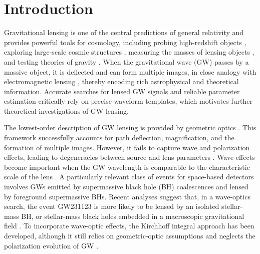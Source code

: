 \documentclass[reprint,amsmath,amssymb,aps,prd]{revtex4-2}
\begin{document}
\maketitle

\section{\label{introduction}Introduction}


Gravitational lensing is one of the central predictions of general relativity and provides powerful tools for cosmology, including probing high-redshift objects \cite{Dan_2012,Vieira_2013,Yang_2022}, exploring large-scale cosmic structures \cite{Refregier_2003,Cao_2012}, measuring the masses of lensing objects \cite{Bolton_2008,Hou_2019_b}, and testing theories of gravity \cite{Wang_2024,Liu_2022}. When the gravitational wave (GW) passes by a massive object, it is deflected and can form multiple images, in close analogy with electromagnetic lensing \cite{Piorkowska_2013,Lin_2023,Haris_2018,Hannuksela_2019,McIsaac_2020,XiaoshuLiu_2021,LIGO_2021,Lo_2023,Abbott_2024,Lo_2025}, thereby encoding rich astrophysical and theoretical information. Accurate searches for lensed GW signals and reliable parameter estimation critically rely on precise waveform templates, which motivates further theoretical investigations of GW lensing.

The lowest-order description of GW lensing is provided by geometric optics \cite{Isaacson_1968,Keeton_2005,Sereno_2006,Bozza_2010,Hou_2019,Li_2025}. This framework successfully accounts for path deflection, magnification, and the formation of multiple images. However, it fails to capture wave and polarization effects, leading to degeneracies between source and lens parameters \cite{Ezquiaga_2021}. Wave effects become important when the GW wavelength is comparable to the characteristic scale of the lens \cite{Meena_2019,Shan_2025,Yuan_2025}. A particularly relevant class of events for space-based detectors involves GWs emitted by supermassive black hole (BH) coalescences and lensed by foreground supermassive BHs. Recent analyses suggest that, in a wave-optics search, the event GW231123 is more likely to be lensed by an isolated stellar-mass BH, or stellar-mass black holes embedded in a macroscopic gravitational field \cite{LVK_lensing,Chan_2025_b,Goyal_2025,Chakraborty_2025,Shan_2025_b}.
To incorporate wave-optic effects, the Kirchhoff integral approach has been developed, although it still relies on geometric-optic assumptions and neglects the polarization evolution of GW \cite{Nakamura_1998,Baraldo_1999,Takahashi_2003,Guo_2020}.
\end{document}
